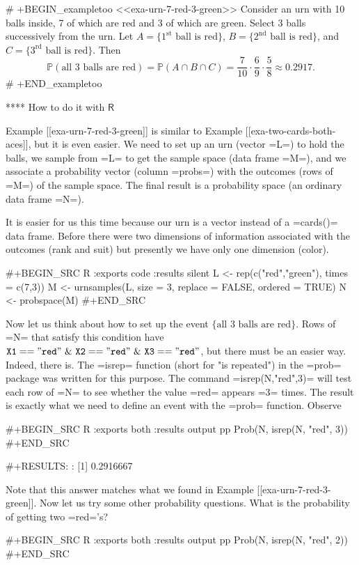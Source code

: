 # +BEGIN_exampletoo
<<exa-urn-7-red-3-green>> Consider an urn with 10 balls inside, 7 of
which are red and 3 of which are green. Select 3 balls successively
from the urn. Let \( A = \{ 1^{\mathrm{st}} \mbox{ ball is red} \} \),
\( B = \{ 2^{\mathrm{nd}} \mbox{ ball is red} \} \), and \( C = \{
3^{\mathrm{rd}} \mbox{ ball is red} \} \). Then \[
\mathbb{P}(\mbox{all 3 balls are red})=\mathbb{P}(A\cap B\cap
C)=\frac{7}{10}\cdot\frac{6}{9}\cdot\frac{5}{8}\approx 0.2917.  \]
# +END_exampletoo

**** How to do it with \(\mathsf{R}\)

Example [[exa-urn-7-red-3-green]] is similar to Example
[[exa-two-cards-both-aces]], but it is even easier. We need to set up
an urn (vector =L=) to hold the balls, we sample from =L= to get the
sample space (data frame =M=), and we associate a probability vector
(column =probs=) with the outcomes (rows of =M=) of the sample
space. The final result is a probability space (an ordinary data frame
=N=).

It is easier for us this time because our urn is a vector instead of a
=cards()= data frame. Before there were two dimensions of information
associated with the outcomes (rank and suit) but presently we have
only one dimension (color).

#+BEGIN_SRC R :exports code :results silent
L <- rep(c("red","green"), times = c(7,3))
M <- urnsamples(L, size = 3, replace = FALSE, ordered = TRUE)
N <- probspace(M)
#+END_SRC

Now let us think about how to set up the event \(\{ \mbox{all 3 balls
are red}\} \). Rows of =N= that satisfy this condition have
\(\mathtt{X1=="red"\ \&\ X2=="red"\ \&\ X3=="red"}\), but there must
be an easier way. Indeed, there is. The =isrep= function (short for
"is repeated") in the =prob= package was written for this
purpose. The command =isrep(N,"red",3)= will test each row of =N= to
see whether the value =red= appears =3= times. The result is exactly
what we need to define an event with the =prob= function. Observe

#+BEGIN_SRC R :exports both :results output pp  
Prob(N, isrep(N, "red", 3))
#+END_SRC

#+RESULTS:
: [1] 0.2916667

Note that this answer matches what we found in Example
[[exa-urn-7-red-3-green]]. Now let us try some other probability
questions. What is the probability of getting two =red='s?

#+BEGIN_SRC R :exports both :results output pp  
Prob(N, isrep(N, "red", 2))
#+END_SRC

